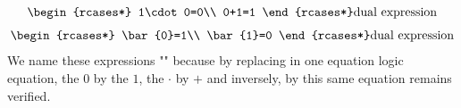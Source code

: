 	\begin{gather*}
	\begin{rcases*}
	1\cdot 0=0\\
	0+1=1
	\end{rcases*} \text{dual expression}
	\end{gather*}
	\begin{gather*}
	\begin{rcases*}
	\bar{0}=1\\
	\bar{1}=0
	\end{rcases*} \text{dual expression}
	\end{gather*}
	We name these expressions "" because by replacing in one equation logic equation, the $0$ by the $1$, the $\cdot$ by $+$ and inversely, by this same equation remains verified.
	
